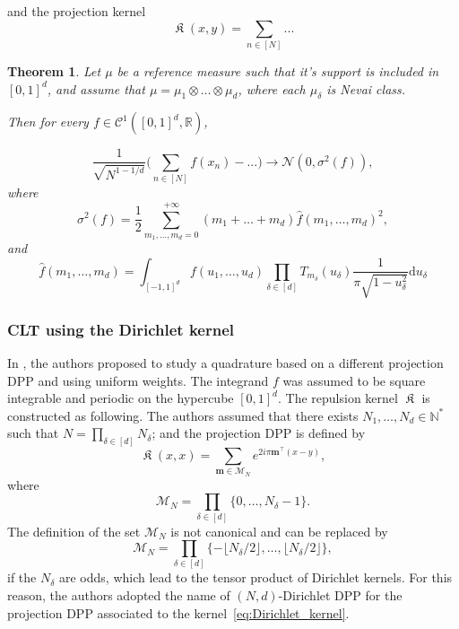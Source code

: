 \documentclass[twoside,11pt]{book}
\newtheorem{theorem}{Theorem}
\DeclareMathOperator{\Tran}{\intercal}
\DeclareMathOperator*{\KDPP}{\mathfrak{K}}
\begin{document}
and the projection kernel
\begin{equation}
\KDPP(x,y) = \sum\limits_{n \in [N]} ...
\end{equation} 

\begin{theorem}
Let $\mu$ be a reference measure such that it's support is included in $[0,1]^{d}$, and assume that $\mu = \mu_{1} \otimes \dots \otimes \mu_{d}$, where each $\mu_{\delta}$ is Nevai class. 


Then for every $f \in \mathcal{C}^{1}([0,1]^{d}, \mathbb{R})$,

\begin{equation}
\frac{1}{\sqrt{N^{1-1/d}}} \big( \sum\limits_{n \in [N]}f(x_{n}) - ... \big) \rightarrow \mathcal{N}(0,\sigma^{2}(f)),
\end{equation}
where
\begin{equation}
\sigma^{2}(f) = \frac{1}{2} \sum\limits_{m_{1}, \dots , m_{d} = 0}^{+\infty} (m_{1}+\dots +m_{d}) \hat{f}(m_{1}, \dots, m_{d})^{2},
\end{equation}
and 
\begin{equation}
\hat{f}(m_{1},\dots,m_{d}) = \int_{[-1,1]^{d}} f(u_{1}, \dots, u_{d}) \prod\limits_{\delta \in [d]} T_{m_{\delta}}(u_{\delta}) \frac{1}{\pi \sqrt{1-u_{\delta}^{2}}} \mathrm{d}u_{\delta}
\end{equation}

\end{theorem}

\subsubsection{CLT using the Dirichlet kernel}
In \citep*{CoMaAm20}, the authors proposed to study a quadrature based on a different projection DPP and using uniform weights. The integrand $f$ was assumed to be square integrable and periodic on the hypercube $[0,1]^{d}$. The repulsion kernel $\KDPP$ is constructed as following. The authors assumed that there exists $N_{1}, \dots, N_{d} \in \mathbb{N}^{*}$ such that $N = \prod\limits_{\delta \in [d]}N_{\delta}$; and the projection DPP is defined by
\begin{equation}\label{eq:Dirichlet_kernel}
\KDPP(x,x) = \sum\limits_{\bm{m} \in \mathcal{M}_{N}}e^{2i \pi \bm{m}^{\Tran}(x-y) },
\end{equation}
where 
\begin{equation}
\mathcal{M}_{N} = \prod\limits_{\delta \in [d]} \{0, \dots, N_{\delta}-1 \}.
\end{equation}
The definition of the set $\mathcal{M}_{N}$ is not canonical and can be replaced by
\begin{equation}
\mathcal{M}_{N} = \prod\limits_{\delta \in [d]} \{-\lfloor{N_{\delta}/2}\rfloor, \dots, \lfloor{N_{\delta}/2}\rfloor \},
\end{equation}
if the $N_{\delta}$ are odds, which lead to the tensor product of Dirichlet kernels. For this reason, the authors adopted the name of $(N,d)$-Dirichlet DPP for the projection DPP associated to the kernel~\eqref{eq:Dirichlet_kernel}.
\end{document}
